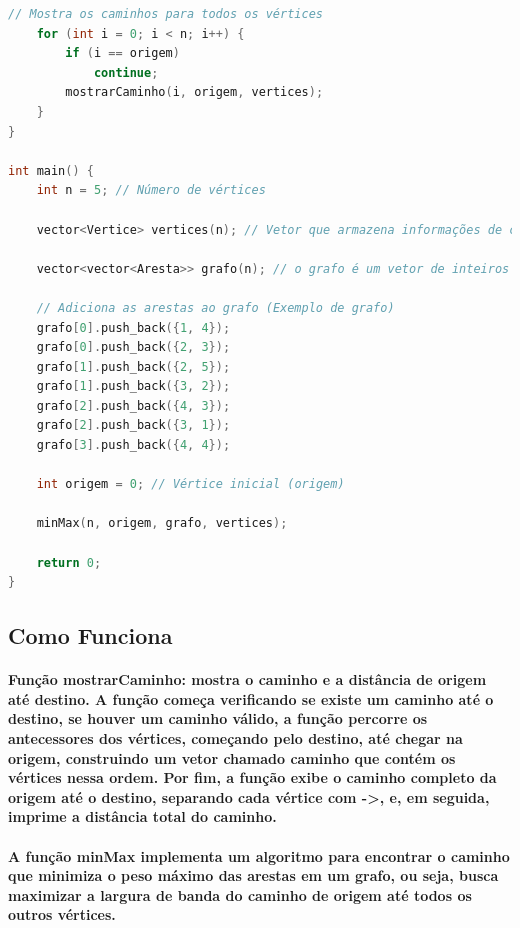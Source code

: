 \documentclass{article}
\begin{document}
\begin{lstlisting}[language=c++ ,caption = Exemplo C++]
    // Mostra os caminhos para todos os vértices
    for (int i = 0; i < n; i++) {
        if (i == origem)
            continue;
        mostrarCaminho(i, origem, vertices);
    }
}

int main() {
    int n = 5; // Número de vértices

    vector<Vertice> vertices(n); // Vetor que armazena informações de cada vértice

    vector<vector<Aresta>> grafo(n); // o grafo é um vetor de inteiros (vértices), onde cada vértice possui um vetor de arestas

    // Adiciona as arestas ao grafo (Exemplo de grafo)
    grafo[0].push_back({1, 4});
    grafo[0].push_back({2, 3});
    grafo[1].push_back({2, 5});
    grafo[1].push_back({3, 2});
    grafo[2].push_back({4, 3});
    grafo[2].push_back({3, 1});
    grafo[3].push_back({4, 4});

    int origem = 0; // Vértice inicial (origem)

    minMax(n, origem, grafo, vertices);

    return 0;
}

\end{lstlisting}
\subsection{Como Funciona}

\paragraph{Função mostrarCaminho: mostra o caminho e a distância de origem até destino. A função começa verificando se existe um caminho até o destino, se houver um caminho válido, a função percorre os antecessores dos vértices, começando pelo destino, até chegar na origem, construindo um vetor chamado caminho que contém os vértices nessa ordem. Por fim, a função exibe o caminho completo da origem até o destino, separando cada vértice com ->, e, em seguida, imprime a distância total do caminho.}

\paragraph{A função minMax implementa um algoritmo para encontrar o caminho que minimiza o peso máximo das arestas em um grafo, ou seja, busca maximizar a largura de banda do caminho de origem até todos os outros vértices.}
\end{document}

